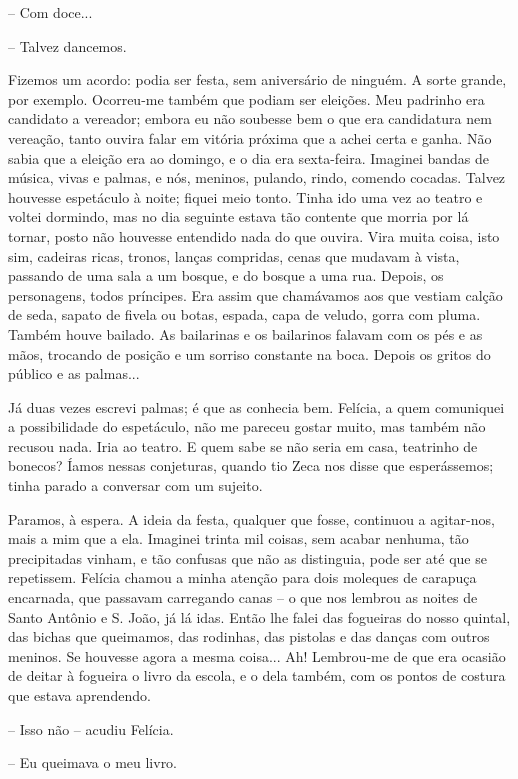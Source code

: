-- Com doce...

-- Talvez dancemos.

Fizemos um acordo: podia ser festa, sem aniversário de ninguém. A sorte
grande, por exemplo. Ocorreu-me também que podiam ser eleições. Meu
padrinho era candidato a vereador; embora eu não soubesse bem o que era
candidatura nem vereação, tanto ouvira falar em vitória próxima que a
achei certa e ganha. Não sabia que a eleição era ao domingo, e o dia era
sexta-feira. Imaginei bandas de música, vivas e palmas, e nós, meninos,
pulando, rindo, comendo cocadas. Talvez houvesse espetáculo à noite;
fiquei meio tonto. Tinha ido uma vez ao teatro e voltei dormindo, mas no
dia seguinte estava tão contente que morria por lá tornar, posto não
houvesse entendido nada do que ouvira. Vira muita coisa, isto sim,
cadeiras ricas, tronos, lanças compridas, cenas que mudavam à vista,
passando de uma sala a um bosque, e do bosque a uma rua. Depois, os
personagens, todos príncipes. Era assim que chamávamos aos que vestiam
calção de seda, sapato de fivela ou botas, espada, capa de veludo, gorra
com pluma. Também houve bailado. As bailarinas e os bailarinos falavam
com os pés e as mãos, trocando de posição e um sorriso constante na
boca. Depois os gritos do público e as palmas...

Já duas vezes escrevi palmas; é que as conhecia bem. Felícia, a quem
comuniquei a possibilidade do espetáculo, não me pareceu gostar muito,
mas também não recusou nada. Iria ao teatro. E quem sabe se não seria em
casa, teatrinho de bonecos? Íamos nessas conjeturas, quando tio Zeca nos
disse que esperássemos; tinha parado a conversar com um sujeito.

Paramos, à espera. A ideia da festa, qualquer que fosse, continuou a
agitar-nos, mais a mim que a ela. Imaginei trinta mil coisas, sem acabar
nenhuma, tão precipitadas vinham, e tão confusas que não as distinguia,
pode ser até que se repetissem. Felícia chamou a minha atenção para dois
moleques de carapuça encarnada, que passavam carregando canas -- o que
nos lembrou as noites de Santo Antônio e S. João, já lá idas. Então lhe
falei das fogueiras do nosso quintal, das bichas que queimamos, das
rodinhas, das pistolas e das danças com outros meninos. Se houvesse
agora a mesma coisa... Ah! Lembrou-me de que era ocasião de deitar à
fogueira o livro da escola, e o dela também, com os pontos de costura
que estava aprendendo.

-- Isso não -- acudiu Felícia.

-- Eu queimava o meu livro.


